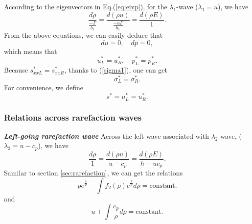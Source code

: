 \documentclass{article}
\numberwithin{equation}{section}
\numberwithin{table}{section}
\begin{document}
According to  the eigenvectors in  Eq.(\ref{eq:eivp}), for the $\lambda_{1}$-wave ($\lambda_1 = u$), we
have
\begin{equation}   \label{e232a}
  \frac{d \rho}{\frac{-\Gamma}{b_1}} = \frac{d (\rho u)}{\frac{-u\Gamma}{b_1}} = \frac{d (\rho E)}{1}.
\end{equation}
From the above equations, we can easily deduce that
\begin{equation}
  du = 0, \quad dp = 0,
\end{equation}
which means that
\begin{equation}
u_L^* = u_R^*, %
 \quad
  p^*_L = p^*_R.
\end{equation}
Because $s^*_{xxL} = s^*_{xxR}$, thanks to (\ref{sigma1}), one can get
\begin{equation}
  \sigma^*_L = \sigma^*_R.
\end{equation}
For convenience, we define
\begin{equation}
  s^* = u_L^* = u_R^*.
\end{equation}

\subsubsection{Relations across rarefaction waves}

\emph{\textbf{Left-going rarefaction wave} }
Across the left wave associated with $\lambda_2$-wave, ($\lambda_2=u-c_p$), we have
\begin{equation}
  \frac{d\rho}{1} = \frac{d(\rho u)}{u-c_p} = \frac{d(\rho E)}{h-uc_p}.
\end{equation}
Samilar to section \ref{sec:rarefaction}, we can get the relations
\begin{equation}\label{eq:p_rhopL}
  p e^{\frac{\lambda}{\rho}} - \int f_2(\rho) e^{\frac{\lambda}{\rho}}d\rho = \text{constant}.
\end{equation}
and
\begin{equation}\label{eq:u_rhopL}
  u+\int\frac{c_p}{\rho} d\rho = \text{constant}.
\end{equation}
\end{document}
